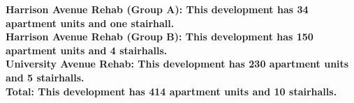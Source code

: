 \bf{Harrison Avenue Rehab (Group A)}: This development has 34 apartment units and one stairhall.\\\bf{Harrison Avenue Rehab (Group B)}: This development has 150 apartment units and 4 stairhalls.\\\bf{University Avenue Rehab}: This development has 230 apartment units and 5 stairhalls.\\\bf{Total}: This development has 414 apartment units and 10 stairhalls.\\